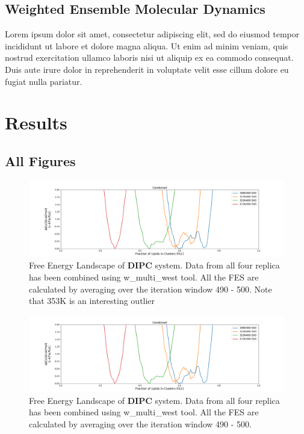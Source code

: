 \documentclass{biophys-new}
\begin{document}
\subsection*{Weighted Ensemble Molecular Dynamics}

Lorem ipsum dolor sit amet, consectetur adipiscing elit, sed do eiusmod tempor incididunt ut labore et dolore magna aliqua. Ut enim ad minim veniam, quis nostrud exercitation ullamco laboris nisi ut aliquip ex ea commodo consequat. Duis aute irure dolor in reprehenderit in voluptate velit esse cillum dolore eu fugiat nulla pariatur. 


\section*{Results}

\subsection*{All Figures}

\begin{figure}[hbt!]
\centering
\includegraphics[width=1.1\linewidth]{all_plots/ClusterLipids2Total/DPPC_DIPC_CHOL/Average_DIPC_MULTI__ClusterLipids2Total.png}
\caption{Free Energy Landscape of \textbf{DIPC} system. Data from all four replica has been combined using w\_multi\_west tool. All the FES are calculated by averaging over the iteration window 490 - 500. Note that 353K is an interesting outlier}
\label{fig:view}

\end{figure}

\begin{figure}[hbt!]
\centering
\includegraphics[width=1.1\linewidth]{all_plots/ClusterLipids2Total/DPPC_DIPC_CHOL/Average_DIPC_MULTI__ClusterLipids2Total.png}
\caption{Free Energy Landscape of \textbf{DIPC} system. Data from all four replica has been combined using w\_multi\_west tool. All the FES are calculated by averaging over the iteration window 490 - 500.}
\label{fig:view}

\end{figure}
\end{document}
